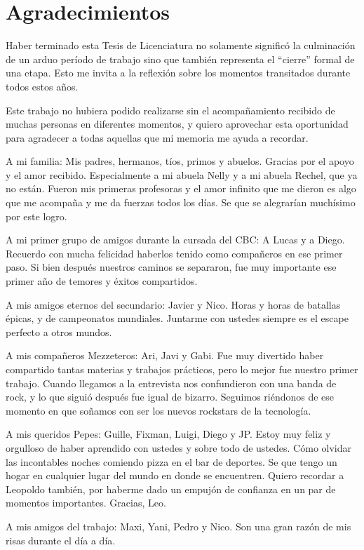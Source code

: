 \chapter*{Agradecimientos}

Haber terminado esta Tesis de Licenciatura no solamente significó la culminación de un arduo período de trabajo sino que también representa el ``cierre'' formal de una etapa. Esto me invita a la reflexión sobre los momentos transitados durante todos estos años. 

Este trabajo no hubiera podido realizarse sin el acompañamiento recibido de muchas personas en diferentes momentos, y quiero aprovechar esta oportunidad para agradecer a todas aquellas que mi memoria me ayuda a recordar.  

A mi familia: Mis padres, hermanos, tíos, primos y abuelos. Gracias por el apoyo y el amor recibido. Especialmente a mi abuela Nelly y a mi abuela Rechel, que ya no están. Fueron mis primeras profesoras y el amor infinito que me dieron es algo que me acompaña y me da fuerzas todos los días. Se que se alegrarían muchísimo por este logro. 

A mi primer grupo de amigos durante la cursada del CBC: A Lucas y a Diego. Recuerdo con mucha felicidad haberlos tenido como compañeros en ese primer paso. Si bien después nuestros caminos se separaron, fue muy importante ese primer año de temores y éxitos compartidos.

A mis amigos eternos del secundario: Javier y Nico. Horas y horas de batallas épicas, y de campeonatos mundiales. Juntarme con ustedes siempre es el escape perfecto a otros mundos. 

A mis compañeros Mezzeteros: Ari, Javi y Gabi. Fue muy divertido haber compartido tantas materias y trabajos prácticos, pero lo mejor fue nuestro primer trabajo. Cuando llegamos a la entrevista nos confundieron con una banda de rock, y lo que siguió después fue igual de bizarro. Seguimos riéndonos de ese momento en que soñamos con ser los nuevos rockstars de la tecnología.

A mis queridos Pepes: Guille, Fixman, Luigi, Diego y JP. Estoy muy feliz y orgulloso de haber aprendido con ustedes y sobre todo de ustedes. Cómo olvidar las incontables noches comiendo pizza en el bar de deportes. Se que tengo un hogar en cualquier lugar del mundo en donde se encuentren. Quiero recordar a Leopoldo también, por haberme dado un empujón de confianza en un par de momentos importantes. Gracias, Leo.

A mis amigos del trabajo: Maxi, Yani, Pedro y Nico. Son una gran razón de mis risas durante el día a día. 


